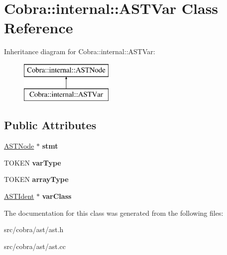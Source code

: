 \hypertarget{class_cobra_1_1internal_1_1_a_s_t_var}{\section{Cobra\+:\+:internal\+:\+:A\+S\+T\+Var Class Reference}
\label{class_cobra_1_1internal_1_1_a_s_t_var}
}
Inheritance diagram for Cobra\+:\+:internal\+:\+:A\+S\+T\+Var\+:\begin{figure}[H]
\begin{center}
\leavevmode
\includegraphics[height=2.000000cm]{class_cobra_1_1internal_1_1_a_s_t_var}
\end{center}
\end{figure}
\subsection*{Public Attributes}
\begin{DoxyCompactItemize}
\item 
\hypertarget{class_cobra_1_1internal_1_1_a_s_t_var_ae331fbe5e112d08352e5c47f26be5c32}{\hyperlink{class_cobra_1_1internal_1_1_a_s_t_node}{A\+S\+T\+Node} $\ast$ {\bfseries stmt}}\label{class_cobra_1_1internal_1_1_a_s_t_var_ae331fbe5e112d08352e5c47f26be5c32}

\item 
\hypertarget{class_cobra_1_1internal_1_1_a_s_t_var_a86c85537f17d498f5b0fcf15e22e76ad}{T\+O\+K\+E\+N {\bfseries var\+Type}}\label{class_cobra_1_1internal_1_1_a_s_t_var_a86c85537f17d498f5b0fcf15e22e76ad}

\item 
\hypertarget{class_cobra_1_1internal_1_1_a_s_t_var_a0e2e0adc76754328f4d85a8616daded2}{T\+O\+K\+E\+N {\bfseries array\+Type}}\label{class_cobra_1_1internal_1_1_a_s_t_var_a0e2e0adc76754328f4d85a8616daded2}

\item 
\hypertarget{class_cobra_1_1internal_1_1_a_s_t_var_a6a00a268063517fbe45c2a9700f2c117}{\hyperlink{class_cobra_1_1internal_1_1_a_s_t_ident}{A\+S\+T\+Ident} $\ast$ {\bfseries var\+Class}}\label{class_cobra_1_1internal_1_1_a_s_t_var_a6a00a268063517fbe45c2a9700f2c117}

\end{DoxyCompactItemize}


The documentation for this class was generated from the following files\+:\begin{DoxyCompactItemize}
\item 
src/cobra/ast/ast.\+h\item 
src/cobra/ast/ast.\+cc\end{DoxyCompactItemize}
